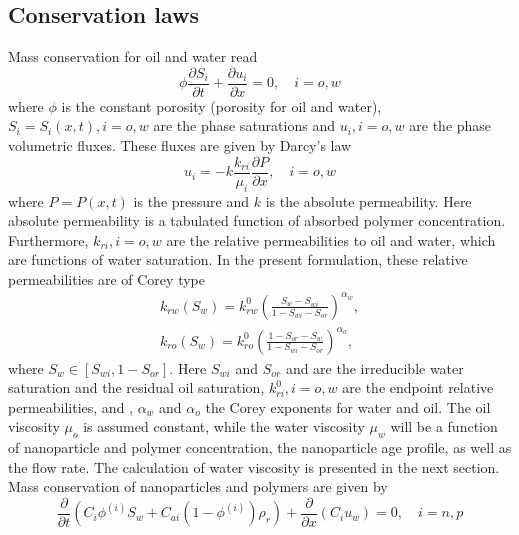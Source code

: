\subsection{Conservation laws}
Mass conservation  for oil and water read
\begin{equation} \label{eq:massConservation} %
    \phi\frac{\partial S_i}{\partial t}+\frac{\partial u_i}{\partial x} = 0,\quad i = o, w
\end{equation}
where $\phi$ is the constant porosity (porosity for oil and water), $S_i=S_i(x,t), i = o,w$ are the phase saturations and $u_i, i=o,w$ are the phase volumetric fluxes. These fluxes are given by Darcy’s law 
\begin{equation} \label{eq:fluxes} %
    u_i= -k\frac{k_{ri}}{\mu_i}\frac{\partial P}{\partial x},\quad i = o, w
\end{equation}
where $P=P(x,t)$  is the pressure and $k$ is the absolute permeability. Here absolute permeability is a tabulated function of absorbed polymer concentration. Furthermore, $k_{ri}, i = o, w$ are the relative permeabilities to oil and water, which are functions of water saturation. In the present formulation, these relative permeabilities are of Corey type
\begin{subequations}
\begin{eqnarray}
 k_{rw}(S_w)=k^0_{rw}(\frac{S_w-S_{wi}}{1-S_{wi}-S_{or}})^{\alpha_w} ,\\
    k_{ro}(S_w)=k^0_{ro}(\frac{1-S_{or}-S_{w}}{1-S_{wi}-S_{or}})^{\alpha_o} ,
\end{eqnarray}
\end{subequations}
where $S_w\in [S_{wi}, 1-S_{or}]$. Here $S_{wi}$ and $S_{or}$ and are the irreducible water saturation and the residual oil saturation, $k^0_{ri}, i=o,w$  are the endpoint relative permeabilities, and , $\alpha_w$ and $\alpha_o$  the Corey exponents for water and oil. The oil viscosity $\mu_o$ is assumed constant, while the water viscosity $\mu_w$ will be a function of nanoparticle and polymer concentration, the nanoparticle age profile, as well as the flow rate. The calculation of water viscosity is presented in the next section.
Mass conservation of nanoparticles and polymers are given by 
\begin{equation} \label{eq:massConsNPpol} %
    \frac{\partial}{\partial t}(C_i\phi^{(i)}S_w + C_{ai}(1-\phi^{(i)})\rho_r)+ \frac{\partial}{\partial x}(C_i u_w) = 0, \quad i = n, p
\end{equation}
